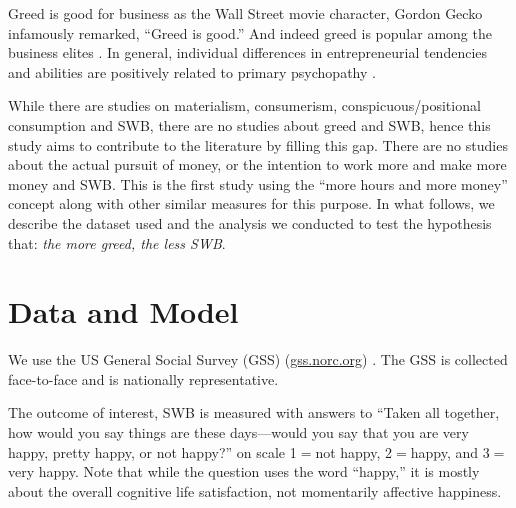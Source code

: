 \documentclass[10pt, letterpaper]{article}
\begin{document}
\begin{spacing}{1.8}


Greed is good for business as the Wall Street movie
 character, Gordon Gecko infamously remarked, ``Greed is good.'' And indeed greed is popular among the business elites \citep{robinson2009greed}.
In general, individual differences in entrepreneurial tendencies
and abilities are positively related to primary psychopathy \citep{akhtar2013greed} %
 \citep{feherrelationship}.

While there are studies on materialism, consumerism,
conspicuous/positional consumption and SWB, there are no studies about  %
greed %
and SWB, hence this study aims to contribute to the literature by filling this gap. 
There are no studies about the actual pursuit of money, or the intention to work
more and make more money and SWB. This is the first study using the ``more hours and
more money'' concept along with other similar measures for this purpose. In what
follows, we describe the dataset used and the analysis we conducted to %
test the hypothesis that: \textit{the more greed, the less SWB}. 

\section{Data and Model}

We use the US General Social Survey (GSS) (\url{gss.norc.org})%
. The GSS is collected face-to-face and is nationally
representative. %

The outcome of interest, SWB is measured with answers to ``Taken all together, how would you say things are these days---would you say that you are very happy,
pretty happy, or not happy?'' on scale  1$=$not happy, 2$=$happy, and 3$=$very happy. 
%
Note that while the question uses the word ``happy,'' it is mostly about the overall
cognitive life satisfaction, not momentarily affective happiness.


\end{spacing}
\end{document}
